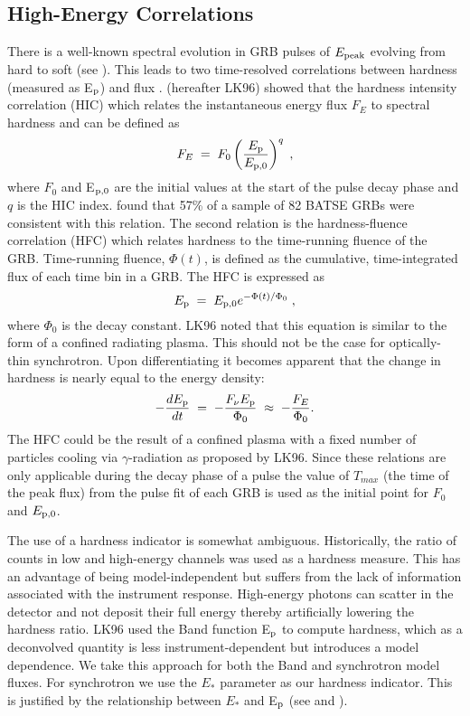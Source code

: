 \subsection{High-Energy Correlations}
\label{sec:results:hec}
There is a well-known spectral evolution in GRB pulses of $E_{\rm
  peak}$ evolving from hard to soft (see
). This leads to two time-resolved
correlations between hardness (measured as E$_{\rm p}$) and flux
\cite{golenetskii:1983,Liang:1996,Ghisellini:2010}. \cite{Liang:1996}
(hereafter LK96) showed that the hardness intensity correlation (HIC)
which relates the instantaneous energy flux $F_{E}$ to spectral
hardness and can be defined as
\begin{equation}
  F_E\;=\;F_0\left(\frac{E_{\rm p}}{E_{{\rm p},0}} \right)^q \;,
\end{equation}
where $F_0$ and E$_{\rm p,0}$ are the initial values at the start of the
pulse decay phase and $q$ is the HIC index. \cite{Ryde:2001} found
that 57\% of a sample of 82 BATSE GRBs were consistent with this
relation. The second relation is the hardness-fluence correlation
(HFC) which relates hardness to the time-running fluence of the
GRB. Time-running fluence, $\Phi(t)$, is defined as the cumulative,
time-integrated flux of each time bin in a GRB. The HFC is expressed
as
\begin{equation}
  \label{eq:hfc}
  E_{\rm p}\;=\;E_{\rm p,0}e^{-\Phi(t)/\Phi_0}\;,
\end{equation}
where $\Phi_0$ is the decay constant. LK96 noted that this equation is
similar to the form of a confined radiating plasma. This should not be
the case for optically-thin synchrotron. Upon differentiating
 it becomes apparent that the change in hardness
is nearly equal to the energy density:
\begin{equation}
  \label{eq:plasma}
  -\frac{dE_{\rm p}}{dt}\;=\;-\frac{F_{\nu}E_{\rm p}}{\Phi_0}\;\approx\;-\frac{F_E}{\Phi_0}.
\end{equation}
The HFC could be the result of a confined plasma with a fixed number
of particles cooling via $\gamma$-radiation as proposed by LK96. Since
these relations are only applicable during the decay phase of a pulse
the value of $T_{max}$ (the time of the peak flux) from the pulse fit
of each GRB is used as the initial point for $F_0$ and $E_{\rm p,0}$.

The use of a hardness indicator is somewhat ambiguous. Historically,
the ratio of counts in low and high-energy channels was used as a
hardness measure. This has an advantage of being model-independent but
suffers from the lack of information associated with the instrument
response. High-energy photons can scatter in the detector and not
deposit their full energy thereby artificially lowering the hardness
ratio. LK96 used the Band function E$_{\rm p}$ to compute hardness,
which as a deconvolved quantity is less instrument-dependent but
introduces a model dependence. We take this approach for both the Band
and synchrotron model fluxes. For synchrotron we use the $E_*$
parameter as our hardness indicator. This is justified by the
relationship between $E_*$ and E$_{\rm p}$ (see
 and ).


